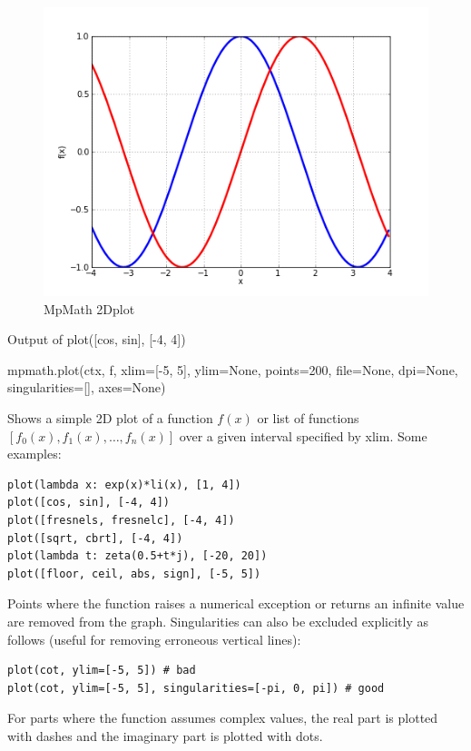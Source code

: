 \begin{figure}[ht]
	\centering
	\includegraphics[scale=1.0]{Charts/png/MpMathPlot.png}
	\caption{MpMath 2Dplot}
	\label{Fig MpMath 2Dplot}
\end{figure}


Output of plot([cos, sin], [-4, 4])

\vpara
mpmath.plot(ctx, f, xlim=[-5, 5], ylim=None, points=200, file=None, dpi=None, singularities=[], axes=None)

\vpara
Shows a simple 2D plot of a function $f(x)$ or list of functions $[f_0(x),f_1(x),\ldots,f_n(x)]$ over a given interval specified by xlim. Some examples:

\begin{lstlisting}
plot(lambda x: exp(x)*li(x), [1, 4])
plot([cos, sin], [-4, 4])
plot([fresnels, fresnelc], [-4, 4])
plot([sqrt, cbrt], [-4, 4])
plot(lambda t: zeta(0.5+t*j), [-20, 20])
plot([floor, ceil, abs, sign], [-5, 5])
\end{lstlisting}


Points where the function raises a numerical exception or returns an infinite value are removed from the graph. Singularities can also be excluded explicitly as follows (useful
for removing erroneous vertical lines):

\begin{lstlisting}
plot(cot, ylim=[-5, 5]) # bad
plot(cot, ylim=[-5, 5], singularities=[-pi, 0, pi]) # good
\end{lstlisting}


For parts where the function assumes complex values, the real part is plotted with dashes and the imaginary part is plotted with dots.

